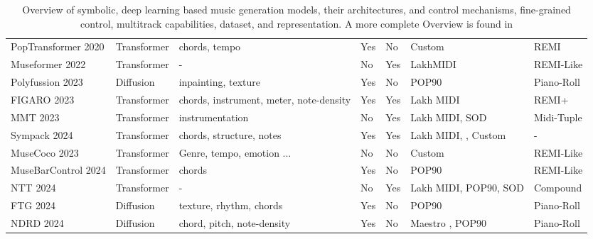 \begin{table}[H]
\begin{tabular}{|p{2.5cm}|p{1.8cm}|p{3cm}|p{1cm}|p{1cm}|p{3cm}|p{2.5cm}|}
        PopTransformer 2020 \cite{Huang_Yang_remi_pop_transformer_2020} & Transformer & chords, tempo & Yes & No & Custom & REMI\\
        Museformer 2022 \cite{Yu_Lu_Wang_Hu_Tan_Ye_Zhang_museformer_2022} & Transformer & - & No & Yes & LakhMIDI \cite{Raffel_2016} & REMI-Like\\
        Polyfussion 2023 \cite{Min_Jiang_Xia_Zhao_polyffusion_2023} & Diffusion & inpainting, texture & Yes & No & POP90 \cite{Wang_Chen_pop90_dataset} & Piano-Roll\\
        FIGARO 2023 \cite{Rütte_figaro_2023} & Transformer & chords, instrument, meter, note-density & Yes & Yes & Lakh MIDI\cite{Raffel_2016} & REMI+ \\
        MMT 2023 \cite{Dong_Chen_MMT_Kirkpatrick_2023} & Transformer & instrumentation & No & Yes & Lakh MIDI\cite{Raffel_2016}, SOD \cite{Crestel_OrchestralDataset} & Midi-Tuple \\
        Sympack 2024 \cite{Chen_Smith_Spijkervet_Wang_Zou_Li_Kong_Du_2024} & Transformer & chords, structure, notes & Yes & Yes & Lakh MIDI\cite{Raffel_2016}, \cite{Bertin-Mahieux_Ellis_Whitman_Lamere_2011}, Custom & -\\
        MuseCoco 2023 \cite{Lu_Xu_Kang_Yu_Xing_Tan_Bian_MuseCoco_2023} & Transformer & Genre, tempo, emotion ...  & No & No & Custom & REMI-Like\\
        MuseBarControl 2024 \cite{Shu_Xu_Musebarcontrol_2024} & Transformer & chords & Yes & No & POP90\cite{Wang_Chen_pop90_dataset} & REMI-Like\\
        NTT 2024\cite{Ryu_Dong_nested_2024} & Transformer & - & No  & Yes & Lakh MIDI\cite{Raffel_2016}, POP90\cite{Wang_Chen_pop90_dataset}, SOD\cite{Crestel_OrchestralDataset} & Compound\\
        FTG 2024\cite{Zhu_Liu_Jiang_Zheng_texture_2024} & Diffusion & texture, rhythm, chords & Yes & No & POP90 \cite{Wang_Chen_pop90_dataset} & Piano-Roll \\
        NDRD 2024\cite{Huang_rule_diffusion_2024} & Diffusion & chord, pitch, note-density & Yes & No & Maestro \cite{hawthorne2018maestro}, POP90\cite{Wang_Chen_pop90_dataset} & Piano-Roll \\
        \hline
    \end{tabular}
    \caption{Overview of symbolic, deep learning based music generation models, their architectures, and control mechanisms, fine-grained control, multitrack capabilities, dataset, and representation. A more complete Overview
    is found in \cite{Ji_Yang_Luo_survey_symbolic_2024}}
    \label{tab:music_models}
\end{table}

